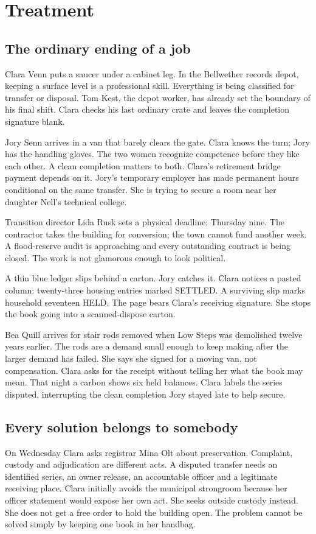 \section{Treatment}
\subsection{The ordinary ending of a job}
Clara Venn puts a saucer under a cabinet leg. In the Bellwether records depot, keeping a surface level is a professional skill. Everything is being classified for transfer or disposal. Tom Kest, the depot worker, has already set the boundary of his final shift. Clara checks his last ordinary crate and leaves the completion signature blank.

Jory Senn arrives in a van that barely clears the gate. Clara knows the turn; Jory has the handling gloves. The two women recognize competence before they like each other. A clean completion matters to both. Clara's retirement bridge payment depends on it. Jory's temporary employer has made permanent hours conditional on the same transfer. She is trying to secure a room near her daughter Nell's technical college.

Transition director Lida Rusk sets a physical deadline: Thursday nine. The contractor takes the building for conversion; the town cannot fund another week. A flood-reserve audit is approaching and every outstanding contract is being closed. The work is not glamorous enough to look political.

A thin blue ledger slips behind a carton. Jory catches it. Clara notices a pasted column: twenty-three housing entries marked SETTLED. A surviving slip marks household seventeen HELD. The page bears Clara's receiving signature. She stops the book going into a scanned-dispose carton.

Bea Quill arrives for stair rods removed when Low Steps was demolished twelve years earlier. The rods are a demand small enough to keep making after the larger demand has failed. She says she signed for a moving van, not compensation. Clara asks for the receipt without telling her what the book may mean. That night a carbon shows six held balances. Clara labels the series disputed, interrupting the clean completion Jory stayed late to help secure.

\subsection{Every solution belongs to somebody}
On Wednesday Clara asks registrar Mina Olt about preservation. Complaint, custody and adjudication are different acts. A disputed transfer needs an identified series, an owner release, an accountable officer and a legitimate receiving place. Clara initially avoids the municipal strongroom because her officer statement would expose her own act. She seeks outside custody instead. She does not get a free order to hold the building open. The problem cannot be solved simply by keeping one book in her handbag.

